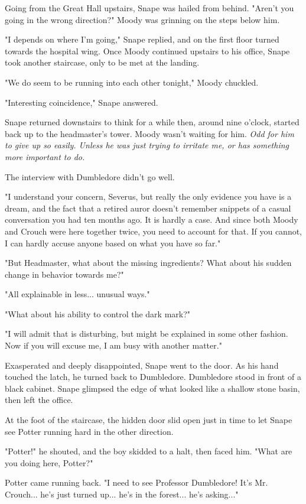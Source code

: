 Going from the Great Hall upstairs, Snape was hailed from behind. "Aren't you going in the wrong direction?" Moody was grinning on the steps below him.

"I depends on where I'm going," Snape replied, and on the first floor turned towards the hospital wing. Once Moody continued upstairs to his office, Snape took another staircase, only to be met at the landing.

"We do seem to be running into each other tonight," Moody chuckled.

"Interesting coincidence," Snape answered.

Snape returned downstairs to think for a while then, around nine o'clock, started back up to the headmaster's tower. Moody wasn't waiting for him. \emph{Odd for him to give up so easily. Unless he was just trying to irritate me, or has something more important to do.}

The interview with Dumbledore didn't go well.

"I understand your concern, Severus, but really the only evidence you have is a dream, and the fact that a retired auror doesn't remember snippets of a casual conversation you had ten months ago. It is hardly a case. And since both Moody and Crouch were here together twice, you need to account for that. If you cannot, I can hardly accuse anyone based on what you have so far."

"But Headmaster, what about the missing ingredients? What about his sudden change in behavior towards me?"

"All explainable in less... unusual ways."

"What about his ability to control the dark mark?"

"I will admit that is disturbing, but might be explained in some other fashion. Now if you will excuse me, I am busy with another matter."

Exasperated and deeply disappointed, Snape went to the door. As his hand touched the latch, he turned back to Dumbledore. Dumbledore stood in front of a black cabinet. Snape glimpsed the edge of what looked like a shallow stone basin, then left the office.

At the foot of the staircase, the hidden door slid open just in time to let Snape see Potter running hard in the other direction.

"Potter!" he shouted, and the boy skidded to a halt, then faced him. "What are you doing here, Potter?"

Potter came running back. "I need to see Professor Dumbledore! It's Mr. Crouch... he's just turned up... he's in the forest... he's asking..."


